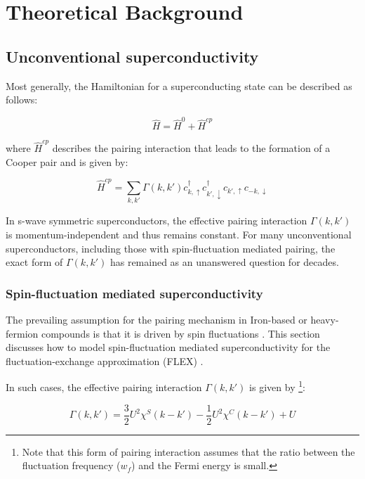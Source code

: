 \documentclass[11pt]{article}
\begin{document}
\section{Theoretical Background}

\subsection{Unconventional superconductivity}

\noindent Most generally, the Hamiltonian for a superconducting state can be described as follows:

\begin{equation}\label{General Hamiltonian}
    \hat{H} = \hat{H}^0 + \hat{H}^{cp}
\end{equation}

\noindent where $\hat{H}^{cp}$ describes the pairing interaction that leads to the formation of a Cooper pair and is given by:

\begin{equation}\label{Hcp}
    \hat{H}^{cp} = \sum_{k,k'} \Gamma(k, k') c^{\dagger}_{k, \uparrow}  c^{\dagger}_{k', \downarrow} c_{k', \uparrow}c_{-k, \downarrow}
\end{equation}

\noindent In s-wave symmetric superconductors, the effective pairing interaction $\Gamma(k,k')$ is momentum-independent and thus remains constant. 
For many unconventional superconductors, including those with spin-fluctuation mediated pairing, the exact form of $\Gamma(k,k')$ has remained as an unanswered question for decades. 
\subsubsection{Spin-fluctuation mediated superconductivity}
\label{subsec:spinfluct}

The prevailing assumption for the pairing mechanism in Iron-based or heavy-fermion compounds 
is that it is driven by spin fluctuations \cite{moriya2000spin}. This section discusses how to
model spin-fluctuation mediated superconductivity for the fluctuation-exchange approximation (FLEX) \cite{esirgen1997fluctuation}. \par
\medskip
\noindent In such cases, the effective pairing interaction $\Gamma(k,k')$ is given by \footnote{Note that this form of pairing interaction 
assumes that the ratio between 
the fluctuation frequency ($w_f$) and the Fermi energy is small.}:

\begin{equation}\label{Pairing interaction SF}
    \Gamma(k,k') = \frac{3}{2} U^2 \chi^S(k-k') -\frac{1}{2}U^2 \chi^C(k-k') + U
\end{equation} 
\end{document}
